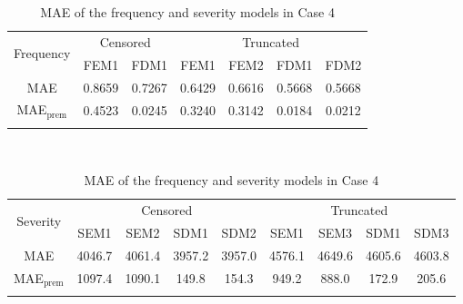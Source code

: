 \documentclass[11pt]{article}
\begin{document}
\begin{table}[!h]
\renewcommand{\tabcolsep}{0.8mm}
\renewcommand{\arraystretch}{1}
\footnotesize
\centering
{\color{blue}
\begin{tabular}[h]{ccccccc}
\toprule
\multirow{2}{*}{Frequency} & \multicolumn{2}{c}{Censored} & \multicolumn{4}{c}{Truncated}\\
\cmidrule(l{3pt}r{3pt}){2-3} \cmidrule(l{3pt}r{3pt}){4-7}
 & FEM1 & FDM1 & FEM1 & FEM2 & FDM1 & FDM2\\
\midrule
MAE & 0.8659 & 0.7267 & 0.6429 & 0.6616 & 0.5668 & 0.5668 \\
MAE$_{\text{prem}}$ & 0.4523 & 0.0245 & 0.3240 & 0.3142 & 0.0184 & 0.0212 \\
\hhline{=======}
\end{tabular}
\\
\vspace{0.3cm}
\begin{tabular}[h]{ccccccccc}
\toprule
\multirow{2}{*}{Severity} & \multicolumn{4}{c}{Censored} & \multicolumn{4}{c}{Truncated}\\
\cmidrule(l{3pt}r{3pt}){2-5} \cmidrule(l{3pt}r{3pt}){6-9}
 & SEM1 & SEM2 & SDM1 & SDM2 & SEM1 & SEM3 & SDM1 & SDM3\\
\midrule
MAE & 4046.7 & 4061.4 & 3957.2 & 3957.0 & 4576.1 & 4649.6 & 4605.6 & 4603.8 \\
MAE$_{\text{prem}}$ & 1097.4 & 1090.1 & 149.8 & 154.3 & 949.2 & 888.0 & 172.9 & 205.6 \\
\hhline{=========}
\end{tabular}
}
\caption{MAE of the frequency and severity models in Case 4}\label{tab:maecase4}
\end{table}
\end{document}
